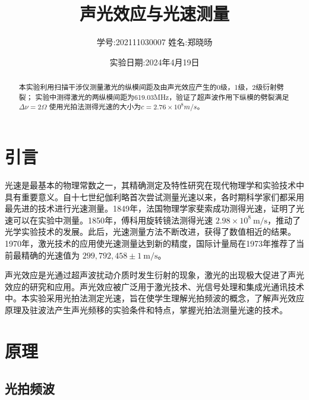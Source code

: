 \documentclass[12pt,a4paper]{article}
\title{\vspace{-4cm}\Large 声光效应与光速测量}  %
\author{\kaishu 学号:202111030007 \hspace{2cm} 姓名:郑晓旸}   %
\date{实验日期:2024年4月19日}
\begin{document}
\maketitle

\begin{abstract}
    本实验利用扫描干涉仪测量激光的纵模间距及由声光效应产生的0级，1级，2级衍射劈裂；
实验中测得激光的两纵模间距为619.03MHz，验证了超声波作用下纵模的劈裂满足$\Delta \nu=2\Omega$
使用光拍法测得光速的大小为$c=2.76\times 10^8m/s$。
\end{abstract}

\section{引言}

光速是最基本的物理常数之一，其精确测定及特性研究在现代物理学和实验技术中具有重要意义。自十七世纪伽利略首次尝试测量光速以来，各时期科学家们都采用最先进的技术进行光速测量。1849年，法国物理学家斐索成功测得光速，证明了光速可以在实验中测量。1850年，傅科用旋转镜法测得光速 $2.98 \times 10^8 \ \text{m/s}$，推动了光学实验技术的发展。此后，光速测量方法不断改进，获得了数值相近的结果。1970年，激光技术的应用使光速测量达到新的精度，国际计量局在1973年推荐了当前最精确的光速值为 $299,792,458 \pm 1 \ \text{m/s}$。

声光效应是光通过超声波扰动介质时发生衍射的现象，激光的出现极大促进了声光效应的研究和应用。声光效应被广泛用于激光技术、光信号处理和集成光通讯技术中。本实验采用光拍法测定光速，旨在使学生理解光拍频波的概念，了解声光效应原理及驻波法产生声光频移的实验条件和特点，掌握光拍法测量光速的技术。

\section{原理}
\subsection{光拍频波}
\end{document}

